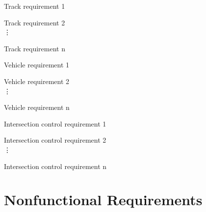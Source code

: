 \documentclass [12pt]{article}
\begin{document}
\begin{TRK}
	\setlength{\itemindent}{.5in}
	\itemsep0pt 
	\item Track requirement 1
	\item Track requirement 2 \\
	\hspace *{2 cm}\vdots
	\item Track requirement n
\end{TRK}


\begin{VHL}
	\setlength{\itemindent}{.5in}
	\itemsep0pt 
	\item Vehicle requirement 1
	\item Vehicle requirement 2 \\
	\hspace *{2 cm}\vdots
	\item Vehicle requirement n
\end{VHL}


\begin{ITC}
\setlength{\itemindent}{.5in}
	\itemsep0pt 
	\item Intersection control requirement 1
	\item Intersection control requirement 2 \\
	\hspace *{2 cm}\vdots
	\item Intersection control requirement n
\end{ITC}




%
%



\section {Nonfunctional Requirements} 
\end{document}
